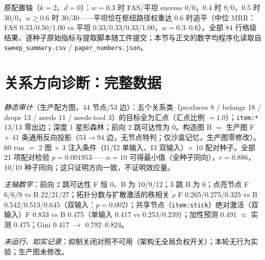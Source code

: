 \documentclass[10pt,a4paper]{ctexart}
\begin{document}
原配置轴（$k{=}2$、$d{=}0$）：$w{=}0.3$ 时 FAS/平坦 success 0/0，0.4 时 8/0，0.5 时 30/0，$w\ge0.6$ 时 30/30——平坦恰在枢纽路径权重达 0.6 时追平（中位 MRR：FAS 0.33/0.50/1.00 vs 平坦 0.33/0.33/0.33/1.00，$w{=}0.3$--0.6）。全部 84 行格级结果、逐种子原始指标与提取脚本随工件提交；本节与正文的数字均程序化读取自 \texttt{sweep\_summary.csv} / \texttt{paper\_numbers.json}。

\section{关系方向诊断：完整数据}
\label{s9:reldir}

\emph{静态审计}（生产配方图，44 节点/53 边）：五个关系类（produces 8 / belongs 18 / drops 13 / needs 11 / needs-tool 3）的目标全为汇点（汇点比例 $=1.0$）；\texttt{item:*} 13/13 零出边；深度 1 星形森林；前向 2 跳可达性为 0。构造图 B $=$ 生产图 F $+$ 41 条通用反向投影（53$\rightarrow$94 边，无节点特判；仅沙盒记忆，生产图零修改）。60 run $=$ 2 图 $\times$ 3 注入条件（I1/I2 单输入、I3 双输入）$\times$ 10 配对种子。全部 21 项配对检验 $p{=}0.001953$——$n{=}10$ 可得最小值（全种子同向），$r{=}0.886$，10/10 种子同向；这只证明方向一致，不证明效应量。

\emph{主轴数字}：前向 2 跳可达性 F 恒 0、B 为 10/9/12；3 跳 B 为 6；点亮节点 F 6/6/9 vs B 22/21/27；拓扑分数与扩散激活的秩相关 $\rho$ F 0.265/0.275/0.325 vs B 0.542/0.513/0.645（双输入：$p{=}0.002$）；共享节点（\texttt{item:stick}）绝对激活（双输入）F 0.833 vs B 0.475（单输入 0.417 vs 0.253/0.239）；加性预测 0.491 $\approx$ 实测 0.475；Gini 0.417 $\rightarrow$ 0.792--0.824。

\emph{未运行、如实记录}：抑制关闭对照不可用（架构无全局负权开关）；本轮无行为实验；生产图未修改。
\end{document}
